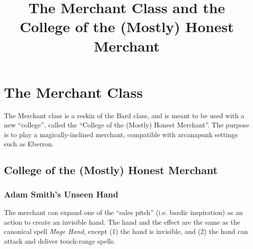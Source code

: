 \documentclass[twocolumn]{dndbook}
\begin{document}
\title{The Merchant Class and the College of the (Mostly) Honest Merchant}

\section{The Merchant Class}

The Merchant class is a reskin of the Bard class, and is meant to be used with a new ``college'', called the ``College of the (Mostly) Honest Merchant''.
The purpose is to play a magically-inclined merchant, compatible with arcanapunk settings such as Eberron.\par



\subsection{College of the (Mostly) Honest Merchant}

\subsubsection{Adam Smith's Unseen Hand}

The merchant can expand one of the ``sales pitch'' (i.e. bardic inspiration) as an action to create an invisible hand.
The hand and the effect are the same as the canonical spell \emph{Mage Hand}, except (1) the hand is invisible, and (2) the hand can attack and deliver touch-range spells.
\end{document}
